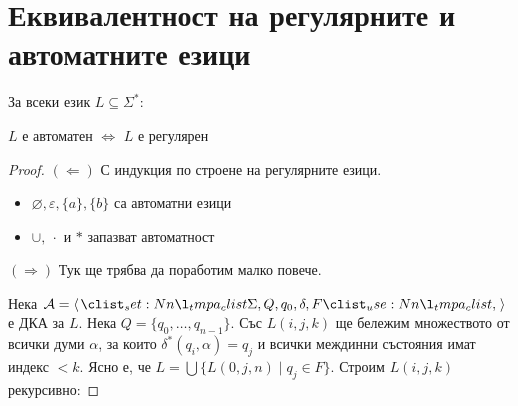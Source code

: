 \section{Еквивалентност на регулярните и автоматните езици}

\begin{theorem}
    За всеки език $L \subseteq \Sigma^*$:
    \begin{center}
        $L$ е автоматен $\iff$ $L$ е регулярен
    \end{center}
\end{theorem}

\begin{proof}
    $(\Leftarrow)$ С индукция по строене на регулярните езици.

    \begin{itemize}
        \item $\varnothing, \varepsilon, \{ a \}, \{ b \}$ са автоматни езици
        \item $\cup, \: \cdot$ и $*$ запазват автоматност
    \end{itemize}

    $(\Rightarrow)$ Тук ще трябва да поработим малко повече.

    Нека $\mathcal{A} = \opair{\Sigma, Q, q_0, \delta, F}$ е ДКА за $L$.
    Нека $Q = \{ q_0, \dots, q_{n - 1} \}$.
    Със $L(i, j, k)$ ще бележим множеството от всички думи $\alpha$,
    за които $\delta^*(q_i, \alpha) = q_j$ и всички междинни състояния имат индекс $< k$.
    Ясно е, че $L = \bigcup \{ L(0, j, n) \mid q_j \in F \}$.
    Строим $L(i, j, k)$ рекурсивно:


\end{proof}
